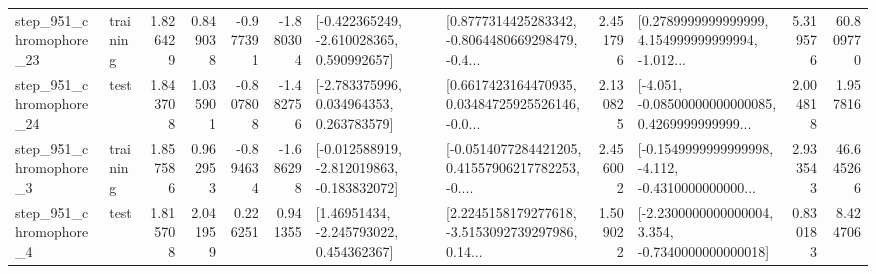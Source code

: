 \begin{tabular}{llrrrrllrlrr}
  step\_951\_chromophore\_23 &  training &      1.826429 &    0.849038 &     -0.977391 & -1.880304 &   [-0.422365249, -2.610028365, 0.590992657] &  [0.8777314425283342, -0.8064480669298479, -0.4... &       2.451796 &  [0.2789999999999999, 4.154999999999994, -1.012... &            5.319576 &         60.809770 \\
  step\_951\_chromophore\_24 &      test &      1.843708 &    1.035901 &     -0.807808 & -1.482756 &    [-2.783375996, 0.034964353, 0.263783579] &  [0.6617423164470935, 0.03484725925526146, -0.0... &       2.130825 &  [-4.051, -0.08500000000000085, 0.4269999999999... &            2.004818 &          1.957816 \\
   step\_951\_chromophore\_3 &  training &      1.857586 &    0.962953 &     -0.894634 & -1.686298 &  [-0.012588919, -2.812019863, -0.183832072] &  [-0.0514077284421205, 0.41557906217782253, -0.... &       2.456002 &  [-0.1549999999999998, -4.112, -0.4310000000000... &            2.933543 &         46.645266 \\
   step\_951\_chromophore\_4 &      test &      1.815708 &    2.041959 &      0.226251 &  0.941355 &     [1.46951434, -2.245793022, 0.454362367] &  [2.2245158179277618, -3.5153092739297986, 0.14... &       1.509022 &  [-2.2300000000000004, 3.354, -0.7340000000000018] &            0.830183 &          8.424706 \\
\bottomrule
\end{tabular}

